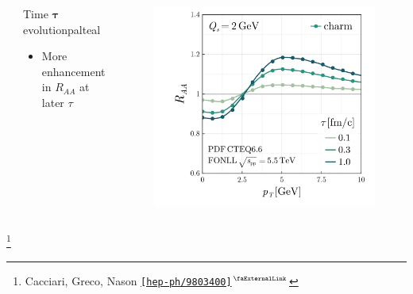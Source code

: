 \documentclass[aspectratio=169,11pt,usenames,dvipsnames]{beamer}
\renewcommand{\thefootnote}{\color{customblue}\faPaperPlaneO}
\newcommand\blfootnote[1]{%
  \begingroup
  \renewcommand\thefootnote{}\footnote{#1}%
  \addtocounter{footnote}{-1}%
  \endgroup
}
\begin{document}
\begin{frame}
\begin{columns}[onlytextwidth,t]
\begin{center}
       \end{center}
       \begin{center}
        \begin{custombox2}{\normalsize Time $\boldsymbol{\tau}$ evolution}{palteal}
            \small
            \begin{varwidth}{0.88\textwidth}
            \begin{itemize}\itemsep0em 
                \itemsep0em
                \footnotesize
                \item More enhancement in $R_{AA}$ at later $\tau$
            \end{itemize}
            \end{varwidth}
        \end{custombox2}
    \end{center}
        \vspace{-10pt}
           \begin{figure}
                \centering
                \includegraphics[width=0.9\columnwidth]{images/clean_raa_tau_dep_quarks_charmQs_2.0_fonll_energy_5500_pdf_cteq.png}
            \end{figure}
       
    \end{columns}

    \vspace{-20pt}
    \blfootnote{\scriptsize Cacciari, Greco, Nason \href{https://arxiv.org/abs/hep-ph/9803400}{{\color{raablue}\texttt{[hep-ph/9803400]$^\text{\scalebox{0.9}{\faExternalLink}}$}}}}
\end{frame}
\end{document}
